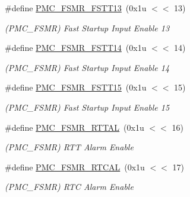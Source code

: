 \begin{DoxyCompactItemize}
\mbox{\label{group__SAMV71__PMC_ga965c157ebdda78a7ed073b5babd25c33}} 
\#define \mbox{\hyperlink{group__SAMV71__PMC_ga965c157ebdda78a7ed073b5babd25c33}{P\+M\+C\+\_\+\+F\+S\+M\+R\+\_\+\+F\+S\+T\+T13}}~(0x1u $<$$<$ 13)
\begin{DoxyCompactList}\small\item\em (P\+M\+C\+\_\+\+F\+S\+MR) Fast Startup Input Enable 13 \end{DoxyCompactList}\item 
\mbox{\label{group__SAMV71__PMC_ga105482e512c6b4f25b3f3b94226b173b}} 
\#define \mbox{\hyperlink{group__SAMV71__PMC_ga105482e512c6b4f25b3f3b94226b173b}{P\+M\+C\+\_\+\+F\+S\+M\+R\+\_\+\+F\+S\+T\+T14}}~(0x1u $<$$<$ 14)
\begin{DoxyCompactList}\small\item\em (P\+M\+C\+\_\+\+F\+S\+MR) Fast Startup Input Enable 14 \end{DoxyCompactList}\item 
\mbox{\label{group__SAMV71__PMC_ga8a3c7b207ee6621a33cd069df0a57575}} 
\#define \mbox{\hyperlink{group__SAMV71__PMC_ga8a3c7b207ee6621a33cd069df0a57575}{P\+M\+C\+\_\+\+F\+S\+M\+R\+\_\+\+F\+S\+T\+T15}}~(0x1u $<$$<$ 15)
\begin{DoxyCompactList}\small\item\em (P\+M\+C\+\_\+\+F\+S\+MR) Fast Startup Input Enable 15 \end{DoxyCompactList}\item 
\mbox{\label{group__SAMV71__PMC_ga3dbc26d096503b7121ca9e3fa7f94174}} 
\#define \mbox{\hyperlink{group__SAMV71__PMC_ga3dbc26d096503b7121ca9e3fa7f94174}{P\+M\+C\+\_\+\+F\+S\+M\+R\+\_\+\+R\+T\+T\+AL}}~(0x1u $<$$<$ 16)
\begin{DoxyCompactList}\small\item\em (P\+M\+C\+\_\+\+F\+S\+MR) R\+TT Alarm Enable \end{DoxyCompactList}\item 
\mbox{\label{group__SAMV71__PMC_ga369c2d741e5ae3b191e5c7d37c9c6537}} 
\#define \mbox{\hyperlink{group__SAMV71__PMC_ga369c2d741e5ae3b191e5c7d37c9c6537}{P\+M\+C\+\_\+\+F\+S\+M\+R\+\_\+\+R\+T\+C\+AL}}~(0x1u $<$$<$ 17)
\begin{DoxyCompactList}\small\item\em (P\+M\+C\+\_\+\+F\+S\+MR) R\+TC Alarm Enable \end{DoxyCompactList}\item 
$$
\end{DoxyCompactItemize}
